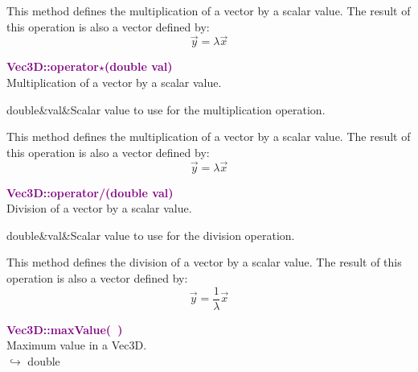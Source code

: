 This method defines the multiplication of a vector by a scalar value.
The result of this operation is also a vector defined by:
\begin{equation*}
\overrightarrow{y} = \lambda \overrightarrow{x}
\end{equation*}

\textcolor{purple}{\textbf{Vec3D::operator$\star$(double val)}}\label{Vec3D::operator*(double val)}\\
Multiplication of a vector by a scalar value.

\begin{tcolorbox}[width=\textwidth,myArgs,tabularx={ll|R}]
double&val&Scalar value to use for the multiplication operation.
\end{tcolorbox}

This method defines the multiplication of a vector by a scalar value.
The result of this operation is also a vector defined by:
\begin{equation*}
\overrightarrow{y} = \lambda \overrightarrow{x}
\end{equation*}

\textcolor{purple}{\textbf{Vec3D::operator/(double val)}}\label{Vec3D::operator/(double val)}\\
Division of a vector by a scalar value.

\begin{tcolorbox}[width=\textwidth,myArgs,tabularx={ll|R}]
double&val&Scalar value to use for the division operation.
\end{tcolorbox}

This method defines the division of a vector by a scalar value.
The result of this operation is also a vector defined by:
\begin{equation*}
\overrightarrow{y} = \frac{1}{\lambda}\overrightarrow{x}
\end{equation*}

\textcolor{purple}{\textbf{Vec3D::maxValue(~)}}\label{Vec3D::maxValue()}\\
Maximum value in a Vec3D.\\ \hspace*{10mm}$\hookrightarrow$ double

